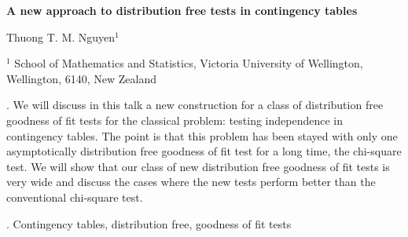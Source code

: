 \documentclass[12pt]{article}
\begin{document}
\begin{flushleft}


{\LARGE\bf A new approach to distribution free tests in contingency tables}


\vspace{1.0cm}

Thuong T. M. Nguyen$^1$ 

\begin{description}

\item $^1$ School of Mathematics and Statistics, Victoria University of Wellington, Wellington, 6140, New Zealand

\end{description}

\end{flushleft}


\vspace{0.75cm}

. We will discuss in this talk a new construction for a class of distribution free goodness of fit tests for the classical problem: testing independence in contingency tables. 
The point is that this problem has been stayed with only one asymptotically distribution free goodness of fit test for a long time, the chi-square test. We will show that our class 
of new distribution free goodness of fit tests is very wide and discuss the cases where the new tests perform better than the conventional chi-square test.
\vskip 2mm

.
Contingency tables, distribution free, goodness of fit tests


%        
%
%        
\end{document}

